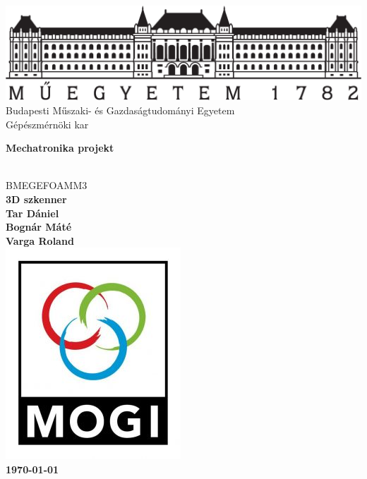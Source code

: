 \documentclass[12pt,a4paper]{article}
\begin{document}
\thispagestyle{empty}
\begin{center}
\includegraphics[scale=0.3]{bme.pdf}\\
\large{Budapesti Műszaki- és Gazdaságtudományi Egyetem\\
Gépészmérnöki kar}\\[1cm]
\begin{Huge}
\textbf{Mechatronika projekt}
\end{Huge}\\[0.5cm]

\Large{BMEGEFOAMM3}\\[2cm]
\Huge{\bf{3D szkenner}}\\[2.5cm]
\bf{\Large{Tar Dániel\\[5pt]
		Bognár Máté\\
		Varga Roland}}\\[1cm]

\includegraphics[scale=0.5]{mogilogo.jpg}\\[1cm]
\large{\today}
\end{center}
\newpage
\tableofcontents
\newpage
\pagestyle{fancy}
\fancyhf{}
\end{document}
